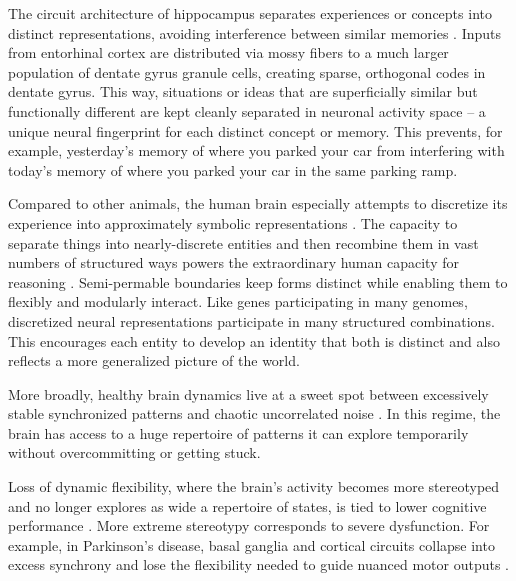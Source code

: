 \documentclass[12pt]{article}
\begin{document}
The circuit architecture of hippocampus separates experiences or concepts into distinct representations, avoiding interference between similar memories \citep{mcclelland1995why, marr1971simple, mcnaughton1987hippocampal, treves1994computational, muller1987effects, leutgeb2007pattern, colgin2008frequency}. Inputs from entorhinal cortex are distributed via mossy fibers to a much larger population of dentate gyrus granule cells, creating sparse, orthogonal codes in dentate gyrus. This way, situations or ideas that are superficially similar but functionally different are kept cleanly separated in neuronal activity space -- a unique neural fingerprint for each distinct concept or memory. This prevents, for example, yesterday's memory of where you parked your car from interfering with today's memory of where you parked your car in the same parking ramp. 

Compared to other animals, the human brain especially attempts to discretize its experience into approximately symbolic representations \citep{dehaene2022symbols, touretzky1988distributed, smolensky1990tensor, behrens2018cognitive}. The capacity to separate things into nearly-discrete entities and then recombine them in vast numbers of structured ways powers the extraordinary human capacity for reasoning \citep{fodor1975language, pinker1994language, lake2015human, chomsky1957syntactic, kurth2023replay}. Semi-permable boundaries keep forms distinct while enabling them to flexibly and modularly interact. Like genes participating in many genomes, discretized neural representations participate in many structured combinations. This encourages each entity to develop an identity that both is distinct and also reflects a more generalized picture of the world.

More broadly, healthy brain dynamics live at a sweet spot between excessively stable synchronized patterns and chaotic uncorrelated noise \citep{beggs2003neuronal, chialvo2010emergent, tognoli2014metastable, deco2011emerging, bak1987self, shew2011information, rabinovich2008transient, haldeman2005critical, kotler2025pathfinding}. In this regime, the brain has access to a huge repertoire of patterns it can explore temporarily without overcommitting or getting stuck. 

Loss of dynamic flexibility, where the brain's activity becomes more stereotyped and no longer explores as wide a repertoire of states, is tied to lower cognitive performance \citep{garrett2013bold, grady2014understanding, cocchi2017criticality, muller2025critical, shew2009neuronal}. More extreme stereotypy corresponds to severe dysfunction. For example, in Parkinson's disease, basal ganglia and cortical circuits collapse into excess synchrony and lose the flexibility needed to guide nuanced motor outputs \citep{hammond2007pathological, brown2003rhythmic}. 
\end{document}
